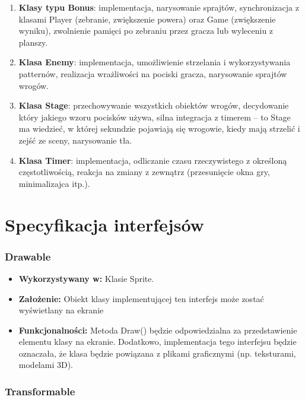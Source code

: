 \documentclass[a4paper,twoside]{article}
\begin{document}
\begin{enumerate}
	\item \textbf{Klasy typu Bonus}: implementacja, narysowanie sprajtów, synchronizacja z klasami Player (zebranie, zwiększenie powera) oraz Game (zwiększenie wyniku), zwolnienie pamięci po zebraniu przez gracza lub wyleceniu z planszy.

	\item \textbf{Klasa Enemy}: implementacja, umożliwienie strzelania i wykorzystywania patternów, realizacja wrażliwości na pociski gracza, narysowanie sprajtów wrogów.

	\item \textbf{Klasa Stage}: przechowywanie wszystkich obiektów wrogów, decydowanie który jakiego wzoru pocisków używa, silna integracja z timerem – to Stage ma wiedzieć, w której sekundzie pojawiają się wrogowie, kiedy mają strzelić i zejść ze sceny, narysowanie tła.
	
	\item \textbf{Klasa Timer}: implementacja, odliczanie czasu rzeczywistego z określoną częstotliwością, reakcja na zmiany z zewnątrz (przesunięcie okna gry, minimalizajca itp.).
\end{enumerate}

\newpage

\part{\huge \textbf{Specyfikacja interfejsów}}

\section{Drawable}

\begin{itemize}
	\item \textbf{Wykorzystywany w:} Klasie Sprite.
	\item \textbf{Założenie:} Obiekt klasy implementującej ten interfejs może zostać wyświetlany na ekranie 
	\item \textbf{Funkcjonalności:} Metoda Draw() będzie odpowiedzialna za przedstawienie elementu klasy na ekranie. Dodatkowo, implementacja tego interfejsu będzie oznaczała, że klasa będzie powiązana z plikami graficznymi (np. teksturami, modelami 3D).
\end{itemize}

\section{Transformable}
\end{document}
